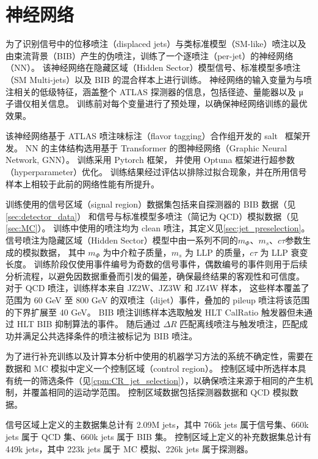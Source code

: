 
\chapter{神经网络}
\label{chap:NN}

为了识别信号中的位移喷注（displaced jets）与类标准模型（SM-like）喷注以及由束流背景（BIB）产生的伪喷注，训练了一个逐喷注（per-jet）的神经网络（NN）。
该神经网络在隐藏区域（Hidden Sector）模型信号、标准模型多喷注（SM Multi-jets）以及 BIB 的混合样本上进行训练。
神经网络的输入变量为与喷注相关的低级特征，涵盖整个 ATLAS 探测器的信息，包括径迹、量能器以及 μ 子谱仪相关信息。
训练前对每个变量进行了预处理，以确保神经网络训练的最优效果。

该神经网络基于 ATLAS 喷注味标注（flavor tagging）合作组开发的 salt~\cite{ATL-PHYS-PUB-2022-027} 框架开发。
NN 的主体结构选用基于 Transformer\cite{vaswani2023attentionneed} 的图神经网络（Graphic Neural Network, GNN）。
训练采用 Pytorch\cite{paszke2019pytorchimperativestylehighperformance} 框架，
并使用 Optuna\cite{akiba2019optunanextgenerationhyperparameteroptimization} 框架进行超参数（hyperparameter）优化。
训练结果经过评估以排除过拟合现象，并在所用信号样本上相较于此前的网络性能有所提升。

训练使用的信号区域（signal region）数据集包括来自探测器的 BIB 数据（见\autoref{sec:detector_data}）
和信号与标准模型多喷注（简记为 QCD）模拟数据（见\autoref{sec:MC}）。
训练中使用的喷注均为 clean 喷注，其定义见\autoref{sec:jet_preselection}。
信号喷注为隐藏区域（Hidden Sector）模型中由一系列不同的$m_\Phi$、$m_s$、$c\tau$参数生成的模拟数据，
其中 $m_\Phi$ 为中介粒子质量，$m_s$ 为 LLP 的质量，$c\tau$ 为 LLP 衰变长度。
训练阶段仅使用事件编号为奇数的信号事件，偶数编号的事件则用于后续分析流程，以避免因数据重叠而引发的偏差，确保最终结果的客观性和可信度。
对于 QCD 喷注，训练样本来自 JZ2W、JZ3W 和 JZ4W 样本，
这些样本覆盖了 \pt 范围为 60 GeV 至 800 GeV 的双喷注（dijet）事件，叠加的 pileup 喷注将该范围的下界扩展至 40 GeV。
BIB 喷注训练样本选取触发 HLT CalRatio 触发器但未通过 HLT BIB 抑制算法的事件。
随后通过 $\Delta R$ 匹配离线喷注与触发喷注，匹配成功并满足公共选择条件的喷注被标记为 BIB 喷注。

为了进行补充训练以及计算本分析中使用的机器学习方法的系统不确定性，需要在数据和 MC 模拟中定义一个控制区域（control region）。
控制区域中所选样本具有统一的筛选条件（见\autoref{cpm:CR_jet_selection}），以确保喷注来源于相同的产生机制，并覆盖相同的运动学范围。
控制区域数据包括探测器数据和 QCD 模拟数据。

信号区域上定义的主数据集总计有 2.09M jets，其中 766k jets 属于信号集、660k jets 属于 QCD 集、660k jets 属于 BIB 集。
控制区域上定义的补充数据集总计有 449k jets，其中 223k jets 属于 MC 模拟、226k jets 属于探测器。

